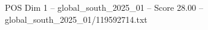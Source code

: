 \begin{textsample}{POS Dim 1 – global\_south\_2025\_01 – Score 28.00 – global\_south\_2025\_01/119592714.txt}
\end{textsample}
